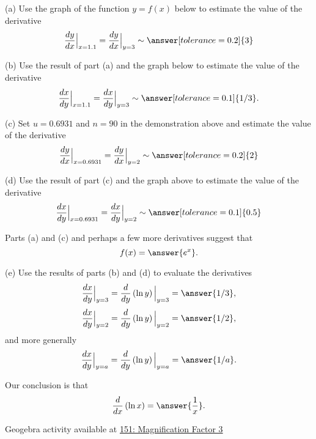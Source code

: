 \documentclass{ximera}
\begin{document}
\begin{example}   \label{Ex:LDfjbbrt}

(a) Use the graph of the function $y=f(x)$ below to estimate the value of the derivative
\[
    \frac{dy}{dx}\Big|_{x=1.1} =  \frac{dy}{dx}\Big|_{y=3} \sim \answer[tolerance=0.2]{3}
\]

(b) Use the result of part (a) and the graph below to estimate the value of the derivative 
\[
      \frac{dx}{dy}\Big|_{x=1.1} = \frac{dx}{dy}\Big|_{y=3} \sim \answer[tolerance=0.1]{1/3} .
\]

\begin{onlineOnly}
    \begin{center}
\end{center}
\end{onlineOnly}

(c) Set $u=0.6931$ and $n=90$ in the demonstration above and estimate the value of the derivative
\[
    \frac{dy}{dx}\Big|_{x=0.6931} = \frac{dy}{dx}\Big|_{y=2} \sim \answer[tolerance=0.2]{2}
\]

(d) Use the result of part (c) and the graph above to estimate the value of the derivative 
\[
      \frac{dx}{dy}\Big|_{x=0.6931} = \frac{dx}{dy}\Big|_{y=2} \sim \answer[tolerance=0.1]{0.5}
\]

\begin{question}  \label{Q:dfrr4f}
Parts (a) and (c) and perhaps a few more derivatives suggest that
\[
     f(x) = \answer{e^x} .
\]
\end{question}

(e) Use the results of parts (b) and (d) to evaluate the derivatives
\[
         \frac{dx}{dy}\Big|_{y=3} = \frac{d}{dy}\left(  \ln y  \right)\Big|_{y=3} = \answer{1/3} ,
\]
\[
         \frac{dx}{dy}\Big|_{y=2} = \frac{d}{dy}\left(  \ln y  \right)\Big|_{y=2} = \answer{1/2} ,
\]
and more generally
\[
             \frac{dx}{dy}\Big|_{y=a} = \frac{d}{dy}\left(  \ln y  \right)\Big|_{y=a} = \answer{1/a} . 
\]


\begin{question}  \label{Q:Dfdsfgt4gg}
Our conclusion is that
\[
   \frac{d}{dx} \left(  \ln x \right) = \answer{\frac{1}{x}} . 
\]
\end{question}

Geogebra activity available at \href{https://www.desmos.com/calculator/nnshzdh6jp}{151: Magnification Factor 3}

\end{example}
\end{document}
